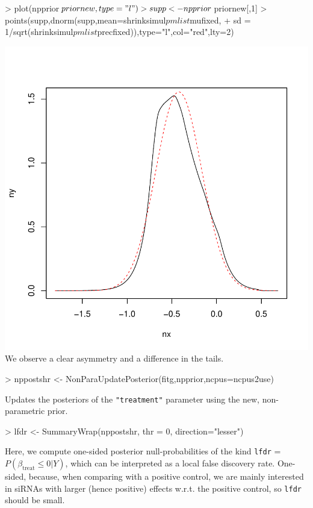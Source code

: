 \documentclass[11pt]{article}
\begin{document}
\begin{Schunk}
\begin{Sinput}
> plot(npprior$priornew,type="l")
> supp <- npprior$priornew[,1]
> points(supp,dnorm(supp,mean=shrinksimul$pmlist$mufixed,
+ sd  = 1/sqrt(shrinksimul$pmlist$precfixed)),type="l",col="red",lty=2)
\end{Sinput}
\end{Schunk}
\includegraphics{ShrinkBayes-049}
\noindent
We observe a clear asymmetry and a difference in the tails.


\begin{Schunk}
\begin{Sinput}
> nppostshr <- NonParaUpdatePosterior(fitg,npprior,ncpus=ncpus2use)
\end{Sinput}
\end{Schunk}
Updates the posteriors of the {\tt "treatment"} parameter using the new, non-parametric prior.

\begin{Schunk}
\begin{Sinput}
> lfdr <- SummaryWrap(nppostshr, thr = 0, direction="lesser")
\end{Sinput}
\end{Schunk}
Here, we compute one-sided posterior null-probabilities of the kind {\tt lfdr} = $P(\beta_{\text{treat}} \leq 0 | Y)$, which can be
interpreted as a local false discovery rate.  One-sided, because, when comparing with a positive control, we are mainly interested
in siRNAs with larger (hence positive) effects w.r.t. the positive control, so {\tt lfdr} should be small.
\end{document}
